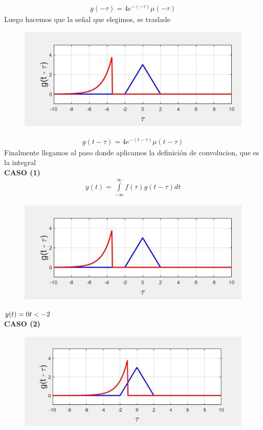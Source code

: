 \documentclass[11pt,letterpaper]{article}
\begin{document}
\begin{align}
g(-\tau) = 4 e^{-(-\tau)} \mu (-\tau)
\end{align}
Luego hacemos que la señal que elegimos, se traslade
\begin{figure} [H]
\includegraphics[scale=00.5]{figura 3}
\end{figure}
\begin{align}
g(t-\tau) = 4e^{-(t-\tau)} \mu (t - \tau)
\end{align}
Finalmente llegamos al paso donde aplicamos la definición de convolucion, que es la integral\\
\textbf{CASO (1)}\\
\begin{align}
y(t) = \overset{\infty}{\underset{-\infty}{\int }} f(\tau) g (t - \tau)dt
\end{align}
\begin{figure} [H]
\includegraphics[scale=0.5]{figura 3}
\end{figure}
$y(t)=0\\
t<-2$\\
\textbf{CASO (2)}
\begin{figure} [H]
\includegraphics[scale=0.5]{figura 4}
\end{figure}
\end{document}
